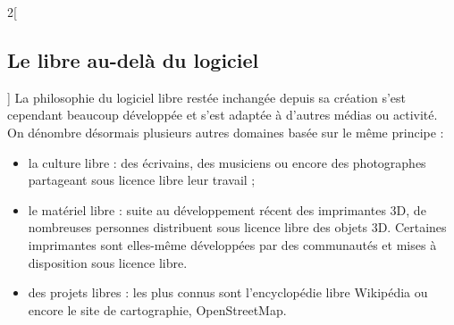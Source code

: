 \begin{multicols}{2}[\subsection{Le libre au-delà du logiciel}]
La philosophie du logiciel libre restée inchangée depuis sa création s’est cependant beaucoup développée et s’est adaptée à d’autres médias ou activité. On dénombre désormais plusieurs autres domaines basée sur le même principe :
\begin{itemize}[label=$\bullet$]
\item la \textcolor{Cdl}{culture libre} : des écrivains, des musiciens ou encore des photographes partageant sous licence libre leur travail ;
\item le \textcolor{Cdl}{matériel libre} : suite au développement récent des imprimantes 3D, de nombreuses personnes distribuent sous licence libre des objets 3D. Certaines imprimantes sont elles-même développées par des communautés et mises à disposition sous licence libre.
\item des \textcolor{Cdl}{projets libres} : les plus connus sont l’encyclopédie libre Wikipédia ou encore le site de cartographie, \mbox{OpenStreetMap}.
\end{itemize}
\end{multicols}

